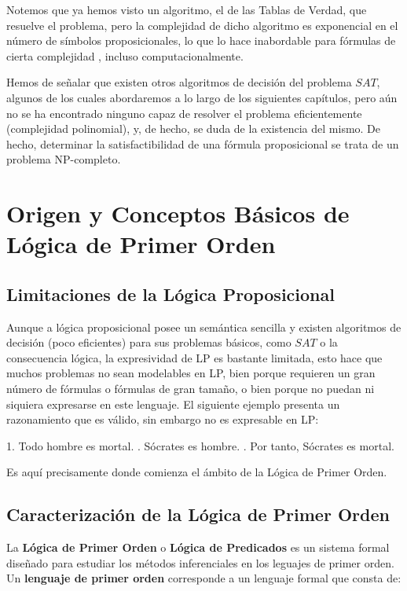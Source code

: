 \documentclass[a4paper]{report}
\begin{document}
Notemos que ya hemos visto un algoritmo, el de las Tablas de Verdad, que resuelve el problema, pero la complejidad de dicho algoritmo es exponencial en el número de símbolos proposicionales, lo que lo hace inabordable para fórmulas de cierta complejidad , incluso computacionalmente.

Hemos de señalar que existen otros algoritmos de decisión del problema $SAT$, algunos de los cuales abordaremos a lo largo de los siguientes capítulos, pero aún no se ha encontrado ninguno capaz de resolver el problema eficientemente (complejidad polinomial), y, de hecho, se duda de la existencia del mismo. De hecho, determinar la satisfactibilidad de una fórmula proposicional se trata de un problema NP-completo.

\section{Origen y Conceptos Básicos de Lógica de Primer Orden}

\subsection{Limitaciones de la Lógica Proposicional}

Aunque a lógica proposicional posee un semántica sencilla y existen algoritmos de decisión (poco eficientes) para sus problemas básicos, como $SAT$ o la consecuencia lógica, la expresividad de LP es bastante limitada, esto hace que muchos problemas no sean modelables en LP, bien porque requieren un gran número de fórmulas o fórmulas de gran tamaño, o bien porque no puedan ni siquiera expresarse en este lenguaje. 
\newpage
El siguiente ejemplo presenta un razonamiento que es válido, sin embargo no es expresable en LP:
\begin{center}
1. Todo hombre es mortal. . Sócrates es hombre. . Por tanto, Sócrates es mortal.
\end{center}

Es aquí precisamente donde comienza el ámbito de la Lógica de Primer Orden.

\subsection{Caracterización de la Lógica de Primer Orden}

La \textbf{Lógica de Primer Orden} o \textbf{Lógica de Predicados} es un sistema formal diseñado para estudiar los métodos inferenciales en los leguajes de primer orden. Un \textbf{lenguaje de primer orden} corresponde a un lenguaje formal que consta de:
\end{document}
